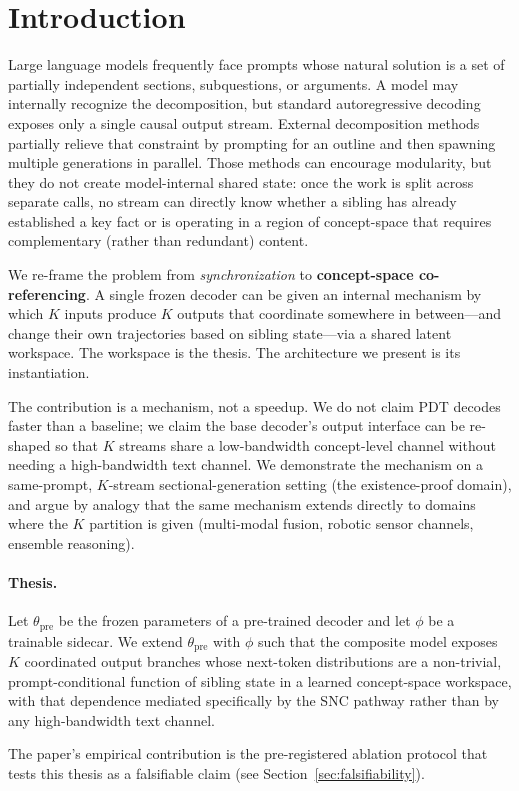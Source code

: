 \section{Introduction}

Large language models frequently face prompts whose natural solution is a set of partially independent sections, subquestions, or arguments. A model may internally recognize the decomposition, but standard autoregressive decoding exposes only a single causal output stream. External decomposition methods \cite{ning2023skeleton,PSLM2024} partially relieve that constraint by prompting for an outline and then spawning multiple generations in parallel. Those methods can encourage modularity, but they do not create model-internal shared state: once the work is split across separate calls, no stream can directly know whether a sibling has already established a key fact or is operating in a region of concept-space that requires complementary (rather than redundant) content.

We re-frame the problem from \emph{synchronization} to \textbf{concept-space co-referencing}. A single frozen decoder can be given an internal mechanism by which $K$ inputs produce $K$ outputs that coordinate somewhere in between---and change their own trajectories based on sibling state---via a shared latent workspace. The workspace is the thesis. The architecture we present is its instantiation.

The contribution is a mechanism, not a speedup. We do not claim PDT decodes faster than a baseline; we claim the base decoder's output interface can be re-shaped so that $K$ streams share a low-bandwidth concept-level channel without needing a high-bandwidth text channel. We demonstrate the mechanism on a same-prompt, $K$-stream sectional-generation setting (the existence-proof domain), and argue by analogy that the same mechanism extends directly to domains where the $K$ partition is given (multi-modal fusion, robotic sensor channels, ensemble reasoning).

\paragraph{Thesis.} Let $\theta_{\text{pre}}$ be the frozen parameters of a pre-trained decoder and let $\phi$ be a trainable sidecar. We extend $\theta_{\text{pre}}$ with $\phi$ such that the composite model exposes $K$ coordinated output branches whose next-token distributions are a non-trivial, prompt-conditional function of sibling state in a learned concept-space workspace, with that dependence mediated specifically by the SNC pathway rather than by any high-bandwidth text channel.

The paper's empirical contribution is the pre-registered ablation protocol that tests this thesis as a falsifiable claim (see Section~\ref{sec:falsifiability}).
